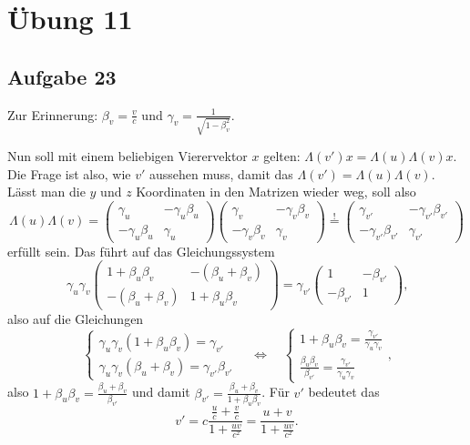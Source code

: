 \chapter*{Übung 11}

\section*{Aufgabe 23}

Zur Erinnerung: $\beta_v = \frac{v}{c}$ und $\gamma_v = \frac{1}{\sqrt{1 - \beta_v^2}}$.

Nun soll mit einem beliebigen Vierervektor $x$ gelten: $\Lambda(v') x = \Lambda(u) \Lambda(v) x$. Die Frage ist also, wie $v'$ aussehen muss, damit das $\Lambda(v') = \Lambda(u) \Lambda(v)$. Lässt man die $y$ und $z$ Koordinaten in den Matrizen wieder weg, soll also
\[
	\Lambda(u) \Lambda(v) 
	= \begin{pmatrix}
		\gamma_u & -\gamma_u \beta_u \\
		-\gamma_u \beta_u & \gamma_u
	\end{pmatrix} \begin{pmatrix}
		\gamma_v & -\gamma_v \beta_v \\
		-\gamma_v \beta_v & \gamma_v
	\end{pmatrix}
	\overset{!}{=} \begin{pmatrix}
		\gamma_{v'} & -\gamma_{v'} \beta_{v'} \\
		-\gamma_{v'} \beta_{v'} & \gamma_{v'}
	\end{pmatrix}
\]
erfüllt sein. Das führt auf das Gleichungssystem
\[
	\gamma_u \gamma_v \begin{pmatrix}
		1 + \beta_u \beta_v & -(\beta_u + \beta_v) \\
		-(\beta_u + \beta_v) & 1 + \beta_u \beta_v
	\end{pmatrix}
	= \gamma_{v'} \begin{pmatrix}
		1 & -\beta_{v'} \\
		-\beta_{v'} & 1
	\end{pmatrix}
	\text{,}
\]
also auf die Gleichungen
\[
	\left\{
	\begin{array}{l}
		\gamma_u \gamma_v (1 + \beta_u \beta_v) = \gamma_{v'} \\
		\gamma_u \gamma_v (\beta_u + \beta_v) = \gamma_{v'} \beta_{v'}	
	\end{array}
	\right.
	\quad \Longleftrightarrow \quad 
	\left\{
	\begin{array}{l}
		1 + \beta_u \beta_v = \frac{\gamma_{v'}}{\gamma_u \gamma_v} \\
		\frac{\beta_u \beta_v}{\beta_{v'}} = \frac{\gamma_{v'}}{\gamma_u \gamma_v}
	\end{array}
	\right.
	\text{,}
\]
also $1 + \beta_u \beta_v = \frac{\beta_u + \beta_v}{\beta_{v'}}$ und damit $\beta_{v'} = \frac{\beta_u + \beta_v}{1 + \beta_u \beta_v}$. Für $v'$ bedeutet das
\[
	v' = c \frac{\frac{u}{c} + \frac{v}{c}}{1 + \frac{uv}{c^2}} = \frac{u + v}{1 + \frac{uv}{c^2}}
	\text{.}
\]

